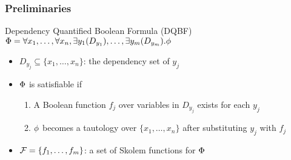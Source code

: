 \begin{frame}
    \frametitle{Preliminaries}
    \begin{block}{Dependency Quantified Boolean Formula (DQBF)}
        $\Phi=\forall x_1, \ldots, \forall x_n, \exists y_1(D_{y_1}), \ldots, \exists y_m(D_{y_m}).\phi$
        \pause
        \begin{itemize}
            \item $D_{y_j} \subseteq \{x_1,\ldots,x_n\}$: the \alert{dependency set} of $y_j$
                  \pause
            \item $\Phi$ is satisfiable if
                  \pause
                  \begin{enumerate}
                      \item A Boolean function $f_j$ over variables in $D_{y_j}$ exists for each $y_j$
                            \pause
                      \item $\phi$ becomes a tautology over $\{x_1,\ldots,x_n\}$ after substituting $y_j$ with $f_j$
                  \end{enumerate}
                  \pause
            \item $\mathcal{F}=\{f_1,\ldots,f_m\}$: a set of Skolem functions for $\Phi$
        \end{itemize}
    \end{block}
\end{frame}
